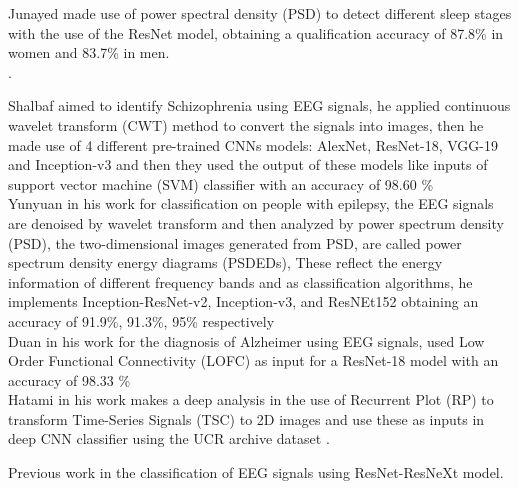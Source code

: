 \documentclass[letterpaper,12pt,openright,oneside]{article}
\begin{document}
Junayed made use of power spectral density (PSD) to detect different sleep stages with the use of the ResNet model, obtaining a qualification accuracy of 87.8\% in women and 83.7\% in men. \cite{hasan} \\.

Shalbaf aimed to identify Schizophrenia using EEG signals, he applied continuous wavelet transform (CWT) method to convert the signals into images, then he made use of 4 different pre-trained CNNs models: AlexNet, ResNet-18, VGG-19 and Inception-v3 and then they used the output of these models like inputs of support vector machine (SVM) classifier with an accuracy of 98.60 \% \cite{Ahmad} \\

Yunyuan in his work for classification on people with epilepsy, the EEG signals are denoised by wavelet transform and then analyzed by power spectrum density (PSD), the two-dimensional images generated from PSD, are called power spectrum density energy diagrams (PSDEDs), These reflect the energy information of different frequency bands and as classification algorithms, he implements Inception-ResNet-v2, Inception-v3, and ResNEt152 obtaining an accuracy of 91.9\%, 91.3\%, 95\% respectively \cite{Gao}\\

Duan in his work for the diagnosis of Alzheimer using EEG signals, used Low Order Functional Connectivity (LOFC) as input for a ResNet-18 model with an accuracy of 98.33 \% \cite{Duan}\\







Hatami in his work makes a deep analysis in the use of Recurrent Plot (RP) to transform Time-Series Signals (TSC) to 2D images and use these as inputs in deep CNN classifier using the UCR archive dataset \cite{hatami2017classification}.

\begin{table}[H]
\centerline{}
\caption{Previous work in the classification of EEG signals using ResNet-ResNeXt model.}
\label{tab 36}
\end{table}
\end{document}
